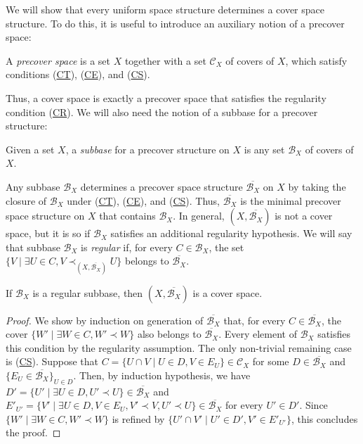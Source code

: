 \documentclass[reqno]{amsart}
\newcommand{\axref}[1]{(\hyperref[ax:#1]{#1})}
\theoremstyle{definition}
\theoremstyle{remark}
\numberwithin{figure}{section}
\newcommand{\rb}{\prec}
\begin{document}
We will show that every uniform space structure determines a cover space structure.
To do this, it is useful to introduce an auxiliary notion of a precover space:

\begin{defn}
A \emph{precover space} is a set $X$ together with a set $\mathcal{C}_X$ of covers of $X$, which satisfy conditions \axref{CT}, \axref{CE}, and \axref{CS}.
\end{defn}

Thus, a cover space is exactly a precover space that satisfies the regularity condition \axref{CR}.
We will also need the notion of a subbase for a precover structure:

\begin{defn}
Given a set $X$, a \emph{subbase} for a precover structure on $X$ is any set $\mathcal{B}_X$ of covers of $X$.
\end{defn}

Any subbase $\mathcal{B}_X$ determines a precover space structure $\overline{\mathcal{B}_X}$ on $X$ by taking the closure of $\mathcal{B}_X$ under \axref{CT}, \axref{CE}, and \axref{CS}.
Thus, $\overline{\mathcal{B}_X}$ is the minimal precover space structure on $X$ that contains $\mathcal{B}_X$.
In general, $(X,\overline{\mathcal{B}_X})$ is not a cover space, but it is so if $\mathcal{B}_X$ satisfies an additional regularity hypothesis.
We will say that subbase $\mathcal{B}_X$ is \emph{regular} if, for every $C \in \mathcal{B}_X$, the set $\{ V \mid \exists U \in C, V \rb_{(X,\overline{\mathcal{B}_X})} U \}$ belongs to $\overline{\mathcal{B}_X}$.

\begin{prop}
If $\mathcal{B}_X$ is a regular subbase, then $(X,\overline{\mathcal{B}_X})$ is a cover space.
\end{prop}
\begin{proof}
We show by induction on generation of $\overline{\mathcal{B}_X}$ that, for every $C \in \overline{\mathcal{B}_X}$, the cover $\{ W' \mid \exists W \in C, W' \rb W \}$ also belongs to $\overline{\mathcal{B}_X}$.
Every element of $\mathcal{B}_X$ satisfies this condition by the regularity assumption.
The only non-trivial remaining case is \axref{CS}.
Suppose that $C = \{ U \cap V \mid U \in D, V \in E_U \} \in \mathcal{C}_X$ for some $D \in \overline{\mathcal{B}_X}$ and $\{ E_U \in \overline{\mathcal{B}_X} \}_{U \in D}$.
Then, by induction hypothesis, we have $D' = \{ U' \mid \exists U \in D, U' \rb U \} \in \overline{\mathcal{B}_X}$ and $E'_{U'} = \{ V' \mid \exists U \in D, V \in E_U, V' \rb V, U' \rb U \} \in \overline{\mathcal{B}_X}$ for every $U' \in D'$.
Since $\{ W' \mid \exists W \in C, W' \rb W \}$ is refined by $\{ U' \cap V' \mid U' \in D', V' \in E'_{U'} \}$, this concludes the proof.
\end{proof}
\end{document}
